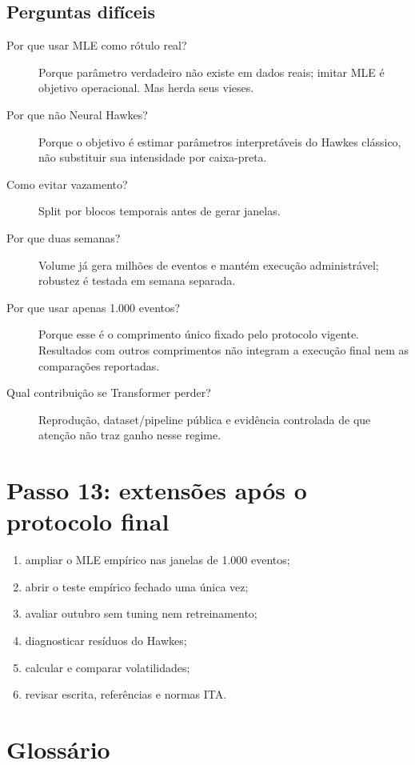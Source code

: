 \documentclass[12pt,a4paper,openany]{report}
\begin{document}
\section{Perguntas difíceis}

\begin{description}
  \item[Por que usar MLE como rótulo real?] Porque parâmetro verdadeiro não existe em
  dados reais; imitar MLE é objetivo operacional. Mas herda seus vieses.
  \item[Por que não Neural Hawkes?] Porque o objetivo é estimar parâmetros
  interpretáveis do Hawkes clássico, não substituir sua intensidade por caixa-preta.
  \item[Como evitar vazamento?] Split por blocos temporais antes de gerar janelas.
  \item[Por que duas semanas?] Volume já gera milhões de eventos e mantém execução
  administrável; robustez é testada em semana separada.
  \item[Por que usar apenas 1.000 eventos?] Porque esse é o comprimento único fixado
  pelo protocolo vigente. Resultados com outros comprimentos não integram a execução
  final nem as comparações reportadas.
  \item[Qual contribuição se Transformer perder?] Reprodução, dataset/pipeline pública
  e evidência controlada de que atenção não traz ganho nesse regime.
\end{description}

\chapter{Passo 13: extensões após o protocolo final}

\begin{enumerate}
  \item ampliar o MLE empírico nas janelas de 1.000 eventos;
  \item abrir o teste empírico fechado uma única vez;
  \item avaliar outubro sem tuning nem retreinamento;
  \item diagnosticar resíduos do Hawkes;
  \item calcular e comparar volatilidades;
  \item revisar escrita, referências e normas ITA.
\end{enumerate}

\appendix
\chapter{Glossário}
\end{document}
